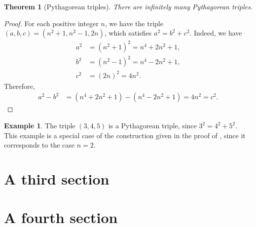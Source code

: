 \documentclass{report}
\theoremstyle{plain}
\newtheorem{theorem}[subsection]{Theorem}
\theoremstyle{definition}
\newtheorem{example}[subsection]{Example}
\theoremstyle{remark}
\numberwithin{equation}{subsection}
\begin{document}
\begin{theorem}[Pythagorean triples]
  \label{theorem:pythagorean-triple}
  There are infinitely many Pythagorean triples.
\end{theorem}
\begin{proof}
  For each positive integer $n$, we have the triple $(a,b,c)=(n^2+1, n^2-1, 2n)$, which satisfies $a^2=b^2+c^2$. Indeed, we have
  \begin{align*}
    a^2 &= (n^2+1)^2 = n^4 + 2n^2 + 1, \\
    b^2 &= (n^2-1)^2 = n^4 - 2n^2 + 1, \\ 
    c^2 &= (2n)^2 = 4n^2.
  \end{align*}
  Therefore,
  \begin{align*}
    a^2 - b^2 &= (n^4 + 2n^2 + 1) - (n^4 - 2n^2 + 1) = 4n^2 = c^2.
  \end{align*}
\end{proof}

\begin{example}
  \label{example:pythagorean-triple}
  The triple $(3,4,5)$ is a Pythagorean triple, since $3^2=4^2+5^2$. This example is a special case of the construction given in the proof of , since it corresponds to the case $n=2$.
\end{example}

\section{A third section}
\label{section:third}


\section{A fourth section}
\label{section:fourth}



\end{document}
